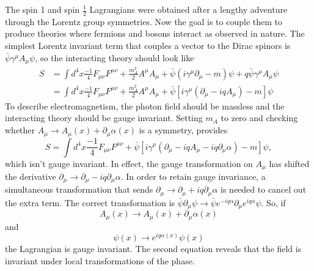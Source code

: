 The spin 1 and spin $\frac{1}{2}$ Lagrangians were obtained after a lengthy adventure through the Lorentz group symmetries. Now the goal is to couple them to produce theories where fermions and bosons interact as observed in nature. The simplest Lorentz invariant term that couples a vector to the Dirac spinors is $\bar{\psi}\gamma^\mu A_\mu \psi$, so the interacting theory should look like 
\begin{equation}
\begin{split}
S &= \int d^4x \frac{-1}{4}F_{\mu\nu}F^{\mu\nu} + \frac{m_A^2}{2} A^\mu A_\mu + \bar{\psi}\left(i\gamma^\mu\partial_\mu - m\right)\psi + q\bar{\psi}\gamma^\mu A_\mu \psi \\
&= \int d^4x \frac{-1}{4}F_{\mu\nu}F^{\mu\nu} + \frac{m_A^2}{2} A^\mu A_\mu + \bar{\psi}\left[i\gamma^\mu\left(\partial_\mu - iqA_\mu\right)- m \right]\psi 
\end{split}
\end{equation}
To describe electromagnetism, the photon field should be massless and the interacting theory should be gauge invariant. Setting $m_A$ to zero and checking whether $A_\mu \rightarrow A_\mu(x) + \partial_\mu\alpha(x)$ is a symmetry, provides  
\begin{equation}
S = \int d^4x \frac{-1}{4}F_{\mu\nu}F^{\mu\nu} + \bar{\psi}\left[i\gamma^\mu\left(\partial_\mu - iqA_\mu - iq\partial_\mu\alpha\right)- m \right]\psi, 
\end{equation}
which isn't gauge invariant. In effect, the gauge transformation on $A_\mu$ has shifted the derivative $\partial_\mu \rightarrow \partial_\mu - iq\partial_\mu\alpha$. In order to retain gauge invariance, a simultaneous transformation that sends $\partial_\mu \rightarrow \partial_\mu + iq\partial_\mu\alpha$ is needed to cancel out the extra term. The correct transformation is $\bar{\psi}\partial_\mu\psi \rightarrow \bar{\psi} e^{-iq\alpha} \partial_\mu e^{iq\alpha} \psi$. So, if 
\begin{equation}
A_\mu(x) \rightarrow A_\mu(x) + \partial_\mu\alpha(x)
\end{equation}
and
\begin{equation}
\psi(x) \rightarrow e^{iq\alpha(x)}\psi(x) 
\end{equation}
the Lagrangian is gauge invariant. The second equation reveals that the field is invariant under local transformations of the phase. 

